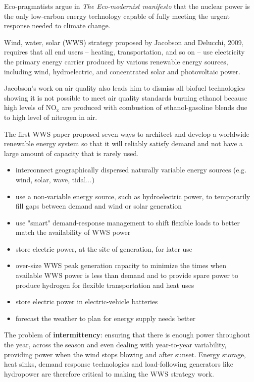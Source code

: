 Eco-pragmatists argue in \textit{The Eco-modernist manifesto} that the nuclear
power is the only low-carbon energy technology capable of fully meeting the
urgent response needed to climate change.

Wind, water, solar (WWS) strategy proposed by Jacobson and Delucchi, 2009,
requires that all end users -- heating, transportation, and so on -- use
electricity the primary energy carrier produced by various renewable energy
sources, including wind, hydroelectric, and concentrated solar and photovoltaic
power.

Jacobson's work on air quality also leads him to dismiss all biofuel
technologies showing it is not possible to meet air quality standards burning
ethanol because high levels of NO$_{\text{x}}$ are produced with combustion
of ethanol-gasoline blends due to high level of nitrogen in air.

The first WWS paper proposed seven ways to architect and develop a worldwide
renewable energy system so that it will reliably satisfy demand and not have
a large amount of capacity that is rarely used.

\begin{itemize}
	\item interconnect geographically dispersed naturally variable energy
	sources (e.g. wind, solar, wave, tidal...)
	\item use a non-variable energy source, such as hydroelectric power,
	to temporarily fill gaps between demand and wind or solar generation
	\item use "smart" demand-response management to shift flexible loads
	to better match the availability of WWS power
	\item store electric power, at the site of generation, for later use
	\item over-size WWS peak generation capacity to minimize the times
	when available WWS power is less than demand and to provide spare
	power to produce hydrogen for flexible transportation and heat uses
	\item store electric power in electric-vehicle batteries
	\item forecast the weather to plan for energy supply needs better
\end{itemize}

The problem of \textbf{intermittency}: ensuring that there is enough power
throughout the year, across the season and even dealing with year-to-year
variability, providing power when the wind stops blowing and after sunset.
Energy storage, heat sinks, demand response technologies and load-following
generators like hydropower are therefore critical to making the WWS strategy
work.

